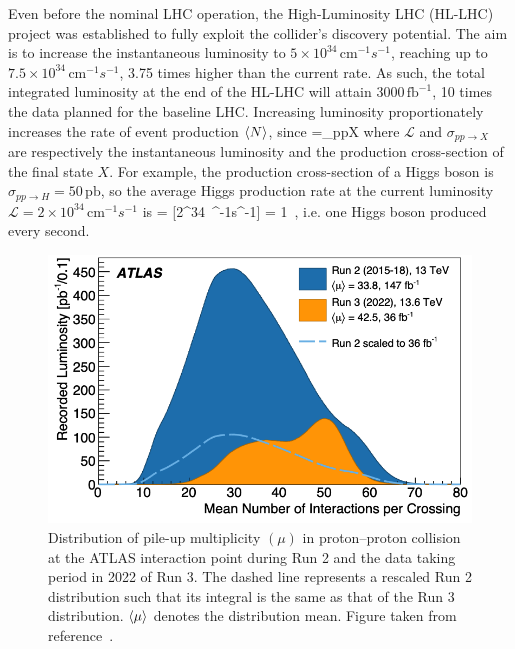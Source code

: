 Even before the nominal LHC operation, the High-Luminosity LHC (HL-LHC) project was established to fully exploit the collider's discovery potential. 
The aim is to increase the instantaneous luminosity to $5\times 10^{34} \, \mathrm{cm}^{-1}s^{-1}$, reaching up to $7.5\times 10^{34} \, \mathrm{cm}^{-1}s^{-1}$, 3.75 times higher than the current rate. 
As such, the total integrated luminosity at the end of the HL-LHC will attain $3000\,\mathrm{fb}^{-1}$, 10 times the data planned for the baseline LHC.
Increasing luminosity proportionately increases the rate of event production $\expval{N}$, since
\beq
\label{eq:hllhc:1}
=\sigma_{pp\to X}
\eeq
where $\mathcal{L}$ and $\sigma_{pp\to X}$ are respectively the instantaneous luminosity and the production cross-section of the final state $X$. 
For example, the production cross-section of a Higgs boson is $\sigma_{pp\to H}=50 \, \mathrm{pb}$, so the average Higgs production rate at the current luminosity $\mathcal{L} = 2\times 10^{34}\, \mathrm{cm}^{-1}s^{-1}$ is 
\beq
\label{eq:hllhc:2}
= [2^{34}\, ^{-1}s^{-1}]  = 1\, ,
\eeq
i.e. one Higgs boson produced every second.

\begin{figure}[h!]
    \centering
    \includegraphics[width=0.65\linewidth]{figures/pileup-dist.png}
    \caption{Distribution of pile-up multiplicity $({\mu})$ in proton--proton collision at the ATLAS interaction point during Run 2 and the data taking period in 2022 of Run 3. The dashed line represents a rescaled Run 2 distribution such that its integral is the same as that of the Run 3 distribution. $\expval{\mu}$ denotes the distribution mean. Figure taken from reference~\cite{software-perf-atlas-run3}.}
    \label{fig:pileup-dist}
\end{figure}

